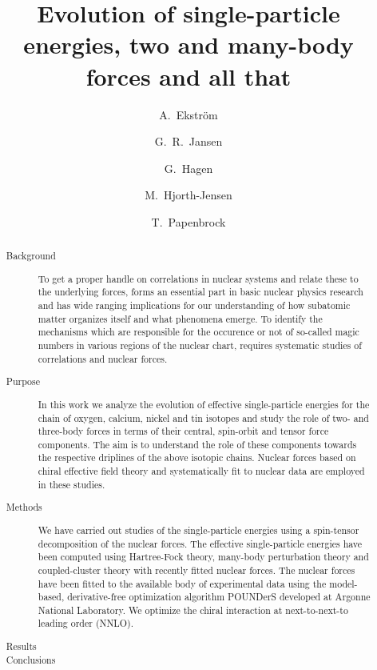 \documentclass[aps,showpacs,floatfix,nofootinbib,preprintnumbers,superscriptaddress,amsmath,amssymb]{revtex4-1}
\begin{document}
\title{Evolution of single-particle energies, two and many-body forces and all that}
\author{A.~Ekstr\"om}
\author{G.~R.~Jansen}
\author{G.~Hagen}
\author{M.~Hjorth-Jensen}
\author{T.~Papenbrock} 

\begin{abstract}
\begin{description}
 \item[Background] To get a proper handle on correlations in nuclear systems and relate
these to the underlying forces, forms an essential part in basic
nuclear physics research and has wide ranging implications for our
understanding of how subatomic matter organizes itself and what
phenomena emerge. To identify the mechanisms which are
responsible for the occurence or not of so-called magic numbers in
various regions of the nuclear chart, requires systematic studies of
correlations and nuclear forces.
 \item[Purpose] In this work we analyze the evolution of effective
   single-particle energies for the chain of oxygen, calcium, nickel
   and tin isotopes and study the role of two- and three-body forces
   in terms of their central, spin-orbit and tensor force components.
   The aim is to understand the role of these components towards the
   respective driplines of the above isotopic chains. Nuclear forces
   based on chiral effective field theory and systematically fit to
   nuclear data are employed in these studies.
 \item[Methods] We have carried out studies of the single-particle
   energies using a spin-tensor decomposition of the nuclear
   forces. The effective single-particle energies have been computed using
   Hartree-Fock theory, many-body perturbation theory and
   coupled-cluster theory with recently fitted nuclear forces.  The
   nuclear forces have been fitted to the available body of
   experimental data using the model-based, derivative-free
   optimization algorithm POUNDerS developed at Argonne National
   Laboratory.  We optimize the chiral interaction at next-to-next-to
   leading order (NNLO).
 \item[Results] 
 \item[Conclusions]
\end{description}
\end{abstract}
\end{document}
